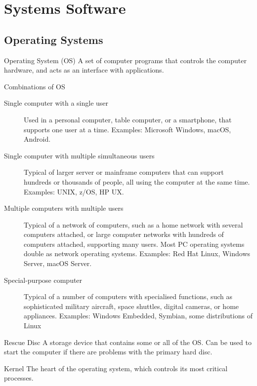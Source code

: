 \documentclass[\main/notes.tex]{subfiles}
\begin{document}
		\section{Systems Software}
			\subsection{Operating Systems}
				\begin{definition}{Operating System (OS)}
					A set of computer programs that controls the computer hardware, and acts as an interface with applications.
				\end{definition}
				\begin{sidenote}{Combinations of OS}
					\begin{description}
						\item[Single computer with a single user] Used in a personal computer, table computer, or a smartphone, that supports one user at a time. Examples: Microsoft Windows, macOS, Android.
						\item[Single computer with multiple simultaneous users] Typical of larger server or mainframe computers that can support hundreds or thousands of people, all using the computer at the same time. Examples: UNIX, z/OS, HP UX.
						\item[Multiple computers with multiple users] Typical of a network of computers, such as a home network with several computers attached, or large computer networks with hundreds of computers attached, supporting many users. Most PC operating systems double as network operating systems. Examples: Red Hat Linux, Windows Server, macOS Server.
						\item[Special-purpose computer] Typical of a number of computers with specialised functions, such as sophisticated military aircraft, space shuttles, digital cameras, or home appliances. Examples: Windows Embedded, Symbian, some distributions of Linux
					\end{description}
				\end{sidenote}
				\begin{definition}{Rescue Disc}
					A storage device that contains some or all of the OS. Can be used to start the computer if there are problems with the primary hard disc.
				\end{definition}
				\begin{definition}{Kernel}
					The heart of the operating system, which controls its most critical processes.
				\end{definition}
\end{document}
